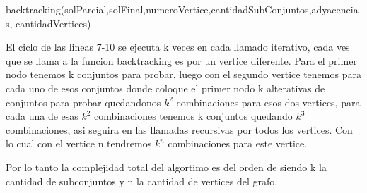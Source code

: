 \begin{algorithm}
 \begin{algorithmic}[1]\parskip=1mm
 \caption{backtracking(solParcial,solFinal,numeroVertice,cantidadSubConjuntos,adyacencias, cantidadVertices)}
  \end{algorithmic}
  \end{algorithm}

El ciclo de las lineas 7-10 se ejecuta k veces en cada llamado iterativo, cada ves que se llama a la funcion backtracking es por un vertice diferente. 
Para el primer nodo tenemos k conjuntos para probar, luego con el segundo vertice tenemos para cada uno de esos conjuntos donde coloque el primer nodo k alterativas de conjuntos para probar quedandonos $k^2$ combinaciones para esos dos vertices,
para cada una de esas $k^2$ combinaciones tenemos k conjuntos quedando $k^3$ combinaciones, asi seguira en las llamadas recursivas por todos los vertices. Con lo cual con el vertice n tendremos $k^n$ combinaciones para este vertice.

Por lo tanto la complejidad total del algortimo es del orden de  siendo k la cantidad de subconjuntos y n la cantidad de vertices del grafo.


